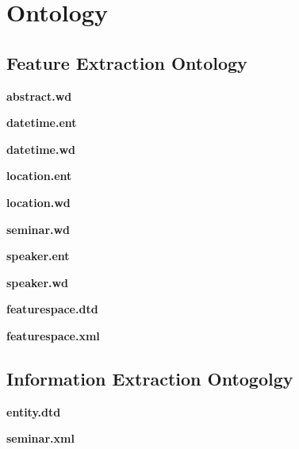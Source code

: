 \chapter{Ontology}
\section{Feature Extraction Ontology}\label{apdx:fe_onto}
\noindent \textbf{abstract.wd}


\noindent \textbf{datetime.ent}


\noindent \textbf{datetime.wd}


\noindent \textbf{location.ent}


\noindent \textbf{location.wd}


\noindent \textbf{seminar.wd}


\noindent \textbf{speaker.ent}


\noindent \textbf{speaker.wd}


\noindent \textbf{featurespace.dtd}


\noindent \textbf{featurespace.xml}



\section{Information Extraction Ontogolgy}\label{apdx:ie_onto}
\noindent \textbf{entity.dtd}


\noindent \textbf{seminar.xml}




